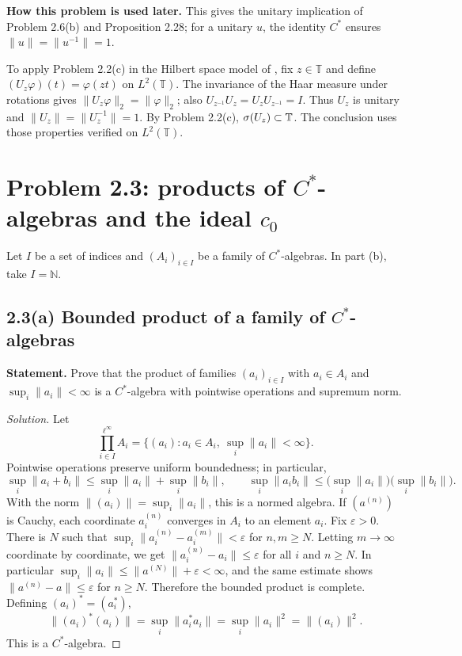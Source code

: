 \noindent\textbf{How this problem is used later.} This gives the unitary implication of Problem 2.6(b) and Proposition 2.28; for a unitary $u$, the identity $C^*$ ensures $\|u\|=\|u^{-1}\|=1$.

\begin{investigacion}[title={Unitary rotations on $L^2(\mathbb T)$}]
To apply Problem 2.2(c) in the Hilbert space model of \cite{BFK2006}, fix $z\in\mathbb T$ and
define $(U_z\varphi)(t)=\varphi(zt)$ on $L^2(\mathbb T)$.
The invariance of the Haar measure under rotations gives $\|U_z\varphi\|_2=\|\varphi\|_2$;
also $U_{z^{-1}}U_z=U_zU_{z^{-1}}=I$. Thus $U_z$ is unitary and
$\|U_z\|=\|U_z^{-1}\|=1$.
By Problem 2.2(c), $\sigma(U_z)\subset\mathbb T$. The conclusion uses those properties
verified on $L^2(\mathbb T)$.
\end{investigacion}

\pagebreak
\section{Problem 2.3: products of \texorpdfstring{$C^*$}{C-star}-algebras and the ideal \texorpdfstring{$c_0$}{c0}}

Let $I$ be a set of indices and $(A_i)_{i\in I}$ be a family of $C^*$-algebras. In part
(b), take $I=\mathbb N$.

\subsection*{2.3(a) Bounded product of a family of $C^*$-algebras}

\noindent\textbf{Statement.} Prove that the product of families $(a_i)_{i\in I}$ with $a_i\in A_i$ and $\sup_i\|a_i\|<\infty$ is a $C^*$-algebra with pointwise operations and supremum norm.

\begin{proof}[Solution]
Let
\[
\prod_{i\in I}^{\ell^\infty} A_i
=\{(a_i): a_i\in A_i,\ \sup_i\|a_i\|<\infty\}.
\]
Pointwise operations preserve uniform boundedness; in particular,
\[
 \sup_i\|a_i+b_i\|\le\sup_i\|a_i\|+\sup_i\|b_i\|,
 \qquad
 \sup_i\|a_ib_i\|\le\bigl(\sup_i\|a_i\|\bigr)
                        \bigl(\sup_i\|b_i\|\bigr).
\]
With the norm $\|(a_i)\|=\sup_i\|a_i\|$, this is a normed algebra. If
$(a^{(n)})$ is Cauchy, each coordinate $a_i^{(n)}$ converges in $A_i$ to an element $a_i$.
Fix $\varepsilon>0$. There is $N$ such that
$\sup_i\|a_i^{(n)}-a_i^{(m)}\|<\varepsilon$ for $n,m\ge N$. Letting $m\to\infty$
coordinate by coordinate, we get $\|a_i^{(n)}-a_i\|\le\varepsilon$ for all $i$ and $n\ge N$.
In particular $\sup_i\|a_i\|\le\|a^{(N)}\|+\varepsilon<\infty$, and the same estimate shows
$\|a^{(n)}-a\|\le\varepsilon$ for $n\ge N$. Therefore the bounded product is complete.
Defining $(a_i)^*=(a_i^*)$,
\[
\|(a_i)^*(a_i)\|
=\sup_i\|a_i^*a_i\|
=\sup_i\|a_i\|^2
=\|(a_i)\|^2.
\]
This is a $C^*$-algebra.
\end{proof}

